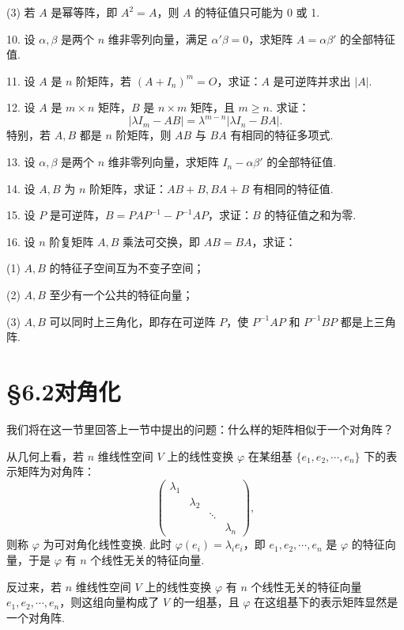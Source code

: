 \documentclass[UTF8, 12pt, fontset=fandol, oneside]{ctexart}
\begin{document}
(3) 若 $A$ 是幂等阵，即 $A^2=A$，则 $A$ 的特征值只可能为 0 或 1.

10. 设 $\alpha,\beta$ 是两个 $n$ 维非零列向量，满足 $\alpha'\beta=0$，求矩阵 $A=\alpha\beta'$ 的全部特征值.

11. 设 $A$ 是 $n$ 阶矩阵，若 $(A+I_n)^m=O$，求证：$A$ 是可逆阵并求出 $|A|$.

12. 设 $A$ 是 $m\times n$ 矩阵，$B$ 是 $n\times m$ 矩阵，且 $m\geq n$. 求证：
\[
|\lambda I_m-AB|=\lambda^{m-n}|\lambda I_n-BA|.
\]
特别，若 $A,B$ 都是 $n$ 阶矩阵，则 $AB$ 与 $BA$ 有相同的特征多项式.

13. 设 $\alpha,\beta$ 是两个 $n$ 维非零列向量，求矩阵 $I_n-\alpha\beta'$ 的全部特征值.

14. 设 $A,B$ 为 $n$ 阶矩阵，求证：$AB+B,BA+B$ 有相同的特征值.

15. 设 $P$ 是可逆阵，$B=PAP^{-1}-P^{-1}AP$，求证：$B$ 的特征值之和为零.

16. 设 $n$ 阶复矩阵 $A,B$ 乘法可交换，即 $AB=BA$，求证：

(1) $A,B$ 的特征子空间互为不变子空间；

(2) $A,B$ 至少有一个公共的特征向量；

(3) $A,B$ 可以同时上三角化，即存在可逆阵 $P$，使 $P^{-1}AP$ 和 $P^{-1}BP$ 都是上三角阵.

\section*{§6.2\quad 对角化}

我们将在这一节里回答上一节中提出的问题：什么样的矩阵相似于一个对角阵？

从几何上看，若 $n$ 维线性空间 $V$ 上的线性变换 $\varphi$ 在某组基 $\{e_1,e_2,\cdots,e_n\}$ 下的表示矩阵为对角阵：
\begin{equation}
\left(\begin{array}{cccc}
\lambda_1 & & & \\
& \lambda_2 & & \\
& & \ddots & \\
& & & \lambda_n
\end{array}\right),
\tag{6.2.1}
\end{equation}
则称 $\varphi$ 为可对角化线性变换. 此时 $\varphi(e_i)=\lambda_ie_i$，即 $e_1,e_2,\cdots,e_n$ 是 $\varphi$ 的特征向量，于是 $\varphi$ 有 $n$ 个线性无关的特征向量.

反过来，若 $n$ 维线性空间 $V$ 上的线性变换 $\varphi$ 有 $n$ 个线性无关的特征向量 $e_1,e_2,\cdots,e_n$，则这组向量构成了 $V$ 的一组基，且 $\varphi$ 在这组基下的表示矩阵显然是一个对角阵.
\end{document}
